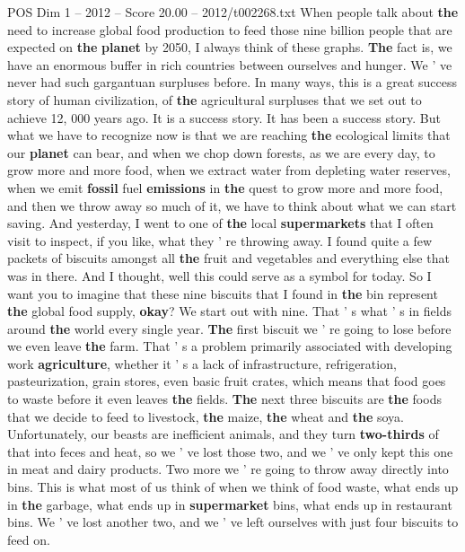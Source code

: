 \begin{textsample}{POS Dim 1 – 2012 – Score 20.00 – 2012/t002268.txt}
When people talk about \textbf{the} need to increase global food production to feed those nine billion people that are expected on \textbf{the} \textbf{planet} by 2050, I always think of these graphs. \textbf{The} fact is, we have an enormous buffer in rich countries between ourselves and hunger.
We ' ve never had such gargantuan surpluses before.
In many ways, this is a great success story of human civilization, of \textbf{the} agricultural surpluses that we set out to achieve 12, 000 years ago.
It is a success story.
It has been a success story.
But what we have to recognize now is that we are reaching \textbf{the} ecological limits that our \textbf{planet} can bear, and when we chop down forests, as we are every day, to grow more and more food, when we extract water from depleting water reserves, when we emit \textbf{fossil} fuel \textbf{emissions} in \textbf{the} quest to grow more and more food, and then we throw away so much of it, we have to think about what we can start saving.
And yesterday, I went to one of \textbf{the} local \textbf{supermarkets} that I often visit to inspect, if you like, what they ' re throwing away.
I found quite a few packets of biscuits amongst all \textbf{the} fruit and vegetables and everything else that was in there.
And I thought, well this could serve as a symbol for today.
So I want you to imagine that these nine biscuits that I found in \textbf{the} bin represent \textbf{the} global food supply, \textbf{okay}?
We start out with nine.
That ' s what ' s in fields around \textbf{the} world every single year. \textbf{The} first biscuit we ' re going to lose before we even leave \textbf{the} farm.
That ' s a problem primarily associated with developing work \textbf{agriculture}, whether it ' s a lack of infrastructure, refrigeration, pasteurization, grain stores, even basic fruit crates, which means that food goes to waste before it even leaves \textbf{the} fields. \textbf{The} next three biscuits are \textbf{the} foods that we decide to feed to livestock, \textbf{the} maize, \textbf{the} wheat and \textbf{the} soya.
Unfortunately, our beasts are inefficient animals, and they turn \textbf{two-thirds} of that into feces and heat, so we ' ve lost those two, and we ' ve only kept this one in meat and dairy products.
Two more we ' re going to throw away directly into bins.
This is what most of us think of when we think of food waste, what ends up in \textbf{the} garbage, what ends up in \textbf{supermarket} bins, what ends up in restaurant bins.
We ' ve lost another two, and we ' ve left ourselves with just four biscuits to feed on.

\end{textsample}
